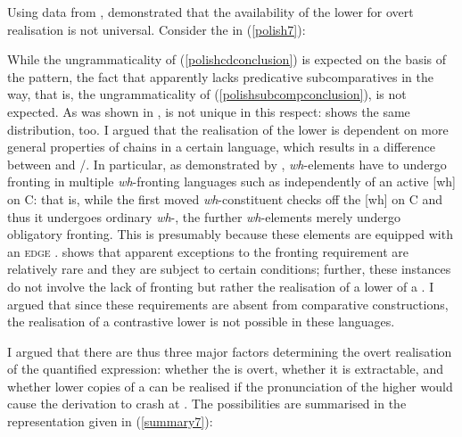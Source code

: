 Using data from ,  demonstrated that the availability of the lower  for overt realisation is not universal. Consider the  in (\ref{polish7}):

\ea \label{polish7}
\z
\z

While the ungrammaticality of (\ref{polishcdconclusion}) is expected on the basis of the  pattern, the fact that  apparently lacks predicative subcomparatives in the  way, that is, the ungrammaticality of (\ref{polishsubcompconclusion}), is not expected. As was shown in ,  is not unique in this respect:  shows the same distribution, too. I argued that the realisation of the lower  is dependent on more general properties of  chains in a certain language, which results in a difference between  and /. In particular, as demonstrated by \citet{boskovic2002}, \textit{wh}-elements have to undergo fronting in multiple \textit{wh}-fronting languages such as  independently of an active [wh]  on C: that is, while the first moved \textit{wh}-constituent checks off the [wh]  on C and thus it undergoes ordinary \textit{wh}-, the further \textit{wh}-elements merely undergo obligatory fronting. This is presumably because these elements are equipped with an \textsc{edge} . \citet{boskovic2002} shows that apparent exceptions to the fronting requirement are relatively rare and they are subject to certain conditions; further, these instances do not involve the lack of fronting but rather the realisation of a lower  of a . I argued that since these requirements are absent from comparative constructions, the realisation of a contrastive lower  is not possible in these languages.

I argued that there are thus three major factors determining the overt realisation of the quantified expression: whether the  is overt, whether it is extractable, and whether lower copies of a  can be realised if the pronunciation of the higher  would cause the derivation to crash at . The possibilities are summarised in the representation given in (\ref{summary7}):


